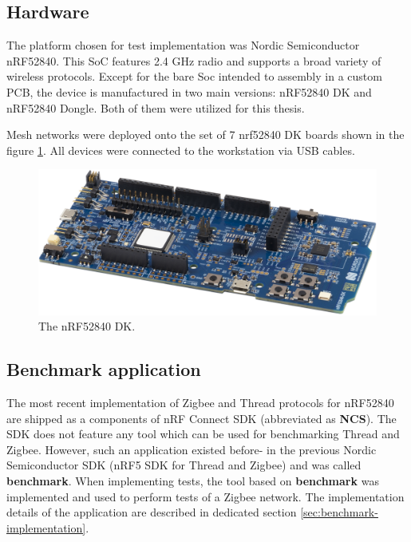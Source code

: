 \medskip


\subsection{Hardware}
 The platform chosen for test implementation was Nordic Semiconductor nRF52840. This SoC features 2.4 GHz 
 radio and supports a broad variety of wireless protocols. Except for the bare Soc intended to assembly in a 
 custom PCB, the device is manufactured in two main versions: nRF52840 DK and nRF52840 Dongle. Both of them were 
 utilized for this thesis.
 
 Mesh networks were deployed onto the set of 7 nrf52840 DK boards shown in the figure \ref{fig:test_boards}. All devices were connected to the
 workstation via USB cables.

\begin{figure}[H]
    \centering
    \includegraphics[scale=0.3]{images/test_boards.png}
    \caption{The nRF52840 DK.}
    \label{fig:test_boards}
\end{figure}

\subsection{Benchmark application}
\label{sec:benchmark}

The most recent implementation of Zigbee and Thread protocols for nRF52840 are shipped as a components of nRF
Connect  SDK (abbreviated as \textbf{NCS}). The SDK does not feature any tool which can be used for 
benchmarking Thread and Zigbee. However, such an application existed before- in the previous Nordic Semiconductor SDK (nRF5 SDK for Thread and Zigbee) and was called \textbf{benchmark}. When implementing tests, the tool based on 
\textbf{benchmark} was implemented and used to perform tests of a Zigbee network. The implementation details
of the application are described in dedicated section \ref{sec:benchmark-implementation}.


